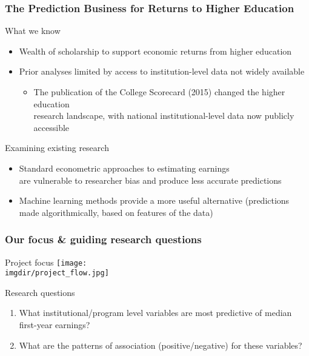 \documentclass[aspectratio=169, t, 10pt]{beamer}
\begin{document}
\begin{frame}
  \frametitle{The Prediction Business for Returns to Higher Education}
  \begin{block}{What we know}
    \begin{itemize}
    	\item Wealth of scholarship to support economic returns from
          higher education
          \citep{card:1995, Card:1999, Card:2001, doyle2016educearn, Oreopoulous_Petronijevic_2013}
    	\item Prior analyses limited by access to institution-level data not widely available 
   	 \begin{itemize}
    		\item The publication of the College Scorecard (2015) changed the higher education \\
		research landscape, with national institutional-level
                data now publicly accessible
                \citep{obama_2013}
   	 \end{itemize}
    \end{itemize}
  \end{block}
  \begin{block}{Examining existing research}
    \begin{itemize}
    \item Standard econometric approaches to estimating earnings \\
    are vulnerable to researcher bias and produce less accurate predictions
    \item Machine learning methods provide a more useful alternative (predictions \\
    made algorithmically, based on features of the data)
    \end{itemize}
  \end{block}
\end{frame}

\begin{frame}
  \frametitle{Our focus \& guiding research questions}
  \begin{block}{Project focus}
    \centering
    \texttt{[image: \\imgdir/project\_flow.jpg]}
  \end{block}
  \begin{block}{Research questions}
    \begin{enumerate}
        \item What institutional\slash program level variables are most
          predictive of median first-year earnings?
        \item What are the patterns of association (positive\slash negative)
          for these variables?
    \end{enumerate}
   \end{block}
\end{frame}
\end{document}
